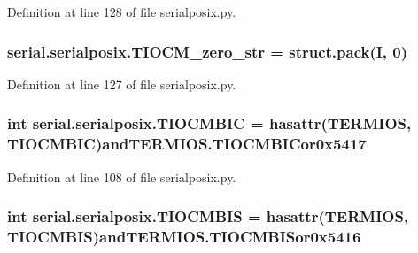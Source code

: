 Definition at line 128 of file serialposix.\+py.

\subsubsection[{\texorpdfstring{T\+I\+O\+C\+M\+\_\+zero\+\_\+str}{TIOCM_zero_str}}]{\setlength{\rightskip}{0pt plus 5cm}serial.\+serialposix.\+T\+I\+O\+C\+M\+\_\+zero\+\_\+str = struct.\+pack(\textquotesingle{}I\textquotesingle{}, 0)}\hypertarget{namespaceserial_1_1serialposix_a7ae33190740ea5e2996788536d37a312}{}\label{namespaceserial_1_1serialposix_a7ae33190740ea5e2996788536d37a312}


Definition at line 127 of file serialposix.\+py.

\subsubsection[{\texorpdfstring{T\+I\+O\+C\+M\+B\+IC}{TIOCMBIC}}]{\setlength{\rightskip}{0pt plus 5cm}int serial.\+serialposix.\+T\+I\+O\+C\+M\+B\+IC = hasattr({\bf T\+E\+R\+M\+I\+OS}, \textquotesingle{}T\+I\+O\+C\+M\+B\+IC\textquotesingle{})and\+T\+E\+R\+M\+I\+O\+S.\+T\+I\+O\+C\+M\+B\+I\+Cor0x5417}\hypertarget{namespaceserial_1_1serialposix_a7e20eafe4028f98d5e1c113d59234514}{}\label{namespaceserial_1_1serialposix_a7e20eafe4028f98d5e1c113d59234514}


Definition at line 108 of file serialposix.\+py.

\subsubsection[{\texorpdfstring{T\+I\+O\+C\+M\+B\+IS}{TIOCMBIS}}]{\setlength{\rightskip}{0pt plus 5cm}int serial.\+serialposix.\+T\+I\+O\+C\+M\+B\+IS = hasattr({\bf T\+E\+R\+M\+I\+OS}, \textquotesingle{}T\+I\+O\+C\+M\+B\+IS\textquotesingle{})and\+T\+E\+R\+M\+I\+O\+S.\+T\+I\+O\+C\+M\+B\+I\+Sor0x5416}\hypertarget{namespaceserial_1_1serialposix_a8550ed18ae30f22650f58a9b19b9c0be}{}\label{namespaceserial_1_1serialposix_a8550ed18ae30f22650f58a9b19b9c0be}


